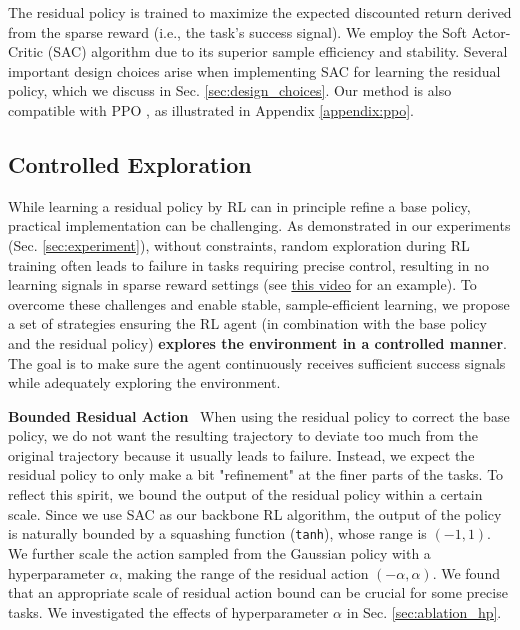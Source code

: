 The residual policy is trained to maximize the expected discounted return derived from the sparse reward (i.e., the task's success signal). We employ the Soft Actor-Critic (SAC) algorithm \citep{sac} due to its superior sample efficiency and stability. Several important design choices arise when implementing SAC for learning the residual policy, which we discuss in Sec. \ref{sec:design_choices}.
Our method is also compatible with PPO \citep{ppo}, as illustrated in Appendix \ref{appendix:ppo}. 


\subsection{Controlled Exploration}
\label{sec:control_explore}

While learning a residual policy by RL can in principle refine a base policy, practical implementation can be challenging. 
As demonstrated in our experiments (Sec. \ref{sec:experiment}), without constraints, random exploration during RL training often leads to failure in tasks requiring precise control, resulting in no learning signals in sparse reward settings (see \href{https://policydecorator.github.io/random_residual_actions.html}{\color{green} this video} for an example).
To overcome these challenges and enable stable, sample-efficient learning, we propose a set of strategies ensuring the RL agent (in combination with the base policy and the residual policy) \textbf{explores the environment in a controlled manner}. The goal is to make sure the agent continuously receives sufficient success signals while adequately exploring the environment.


\textbf{Bounded Residual Action}~ 
When using the residual policy to correct the base policy, we do not want the resulting trajectory to deviate too much from the original trajectory because it usually leads to failure. Instead, we expect the residual policy to only make a bit "refinement" at the finer parts of the tasks. 
To reflect this spirit, we bound the output of the residual policy within a certain scale. Since we use SAC as our backbone RL algorithm, the output of the policy is naturally bounded by a squashing function (\texttt{tanh}), whose range is $(-1, 1)$. We further scale the action sampled from the Gaussian policy with a hyperparameter $\alpha$, making the range of the residual action $(-\alpha, \alpha)$.
We found that an appropriate scale of residual action bound can be crucial for some precise tasks. We investigated the effects of hyperparameter $\alpha$ in Sec. \ref{sec:ablation_hp}.



